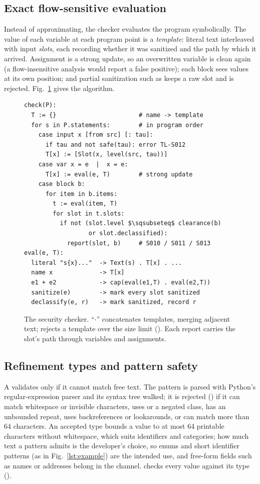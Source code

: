 \documentclass[journal]{IEEEtran}
\begin{document}
\subsection{Exact flow-sensitive evaluation}
Instead of approximating, the checker evaluates the program symbolically. The value of each variable at each program point is a \emph{template}: literal text interleaved with input \emph{slots}, each recording whether it was sanitized and the path by which it arrived. Assignment is a strong update, so an overwritten variable is clean again (a flow-insensitive analysis would report a false positive); each block sees values at its own position; and partial sanitization such as  keeps a raw slot and is rejected. Fig.~\ref{fig:algo} gives the algorithm.

\begin{figure}[t]
\begin{lstlisting}[language={},basicstyle=\ttfamily\scriptsize,mathescape=true]
check(P):
  T := {}                       # name -> template
  for s in P.statements:        # in program order
    case input x [from src] [: tau]:
      if tau and not safe(tau): error TL-S012
      T[x] := [Slot(x, level(src, tau))]
    case var x = e  |  x = e:
      T[x] := eval(e, T)        # strong update
    case block b:
      for item in b.items:
        t := eval(item, T)
        for slot in t.slots:
          if not (slot.level $\sqsubseteq$ clearance(b)
                  or slot.declassified):
            report(slot, b)     # S010 / S011 / S013
eval(e, T):
  literal "s{x}..."  -> Text(s) . T[x] . ...
  name x             -> T[x]
  e1 + e2            -> cap(eval(e1,T) . eval(e2,T))
  sanitize(e)        -> mark every slot sanitized
  declassify(e, r)   -> mark sanitized, record r
\end{lstlisting}
\caption{The security checker. ``$\cdot$'' concatenates templates, merging adjacent text;  rejects a template over the size limit (). Each report carries the slot's path through variables and assignments.}
\label{fig:algo}
\end{figure}

\subsection{Refinement types and pattern safety}\label{sec:patterns}
A  validates only if it cannot match free text. The pattern is parsed with Python's regular-expression parser and its syntax tree walked; it is rejected () if it can match whitespace or invisible characters, uses  or a negated class, has an unbounded repeat, uses backreferences or lookarounds, or can match more than 64 characters. An accepted type bounds a value to at most 64 printable characters without whitespace, which suits identifiers and categories; how much text a pattern admits is the developer's choice, so enums and short identifier patterns (as in Fig.~\ref{lst:example}) are the intended use, and free-form fields such as names or addresses belong in the  channel.  checks every value against its type ().
\end{document}
